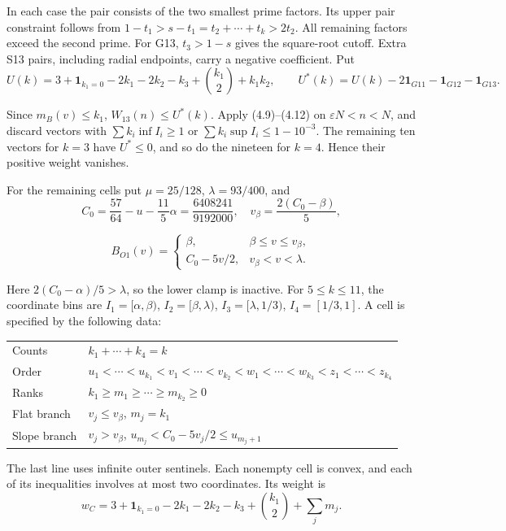 In each case the pair consists of the two smallest prime factors.
Its upper pair constraint follows from
$1-t_1>s-t_1=t_2+\cdots+t_k>2t_2$.
All remaining factors exceed the second prime.
For G13, $t_3>1-s$ gives the square-root cutoff.
Extra S13 pairs, including radial endpoints, carry a negative coefficient.
Put
\begingroup\small
\[
 U(k)=3+\mathbf1_{k_1=0}-2k_1-2k_2-k_3
          +\binom{k_1}{2}+k_1k_2,\qquad
 U^*(k)=U(k)-2\mathbf1_{G11}-\mathbf1_{G12}-\mathbf1_{G13}.
\tag{5.29b}
\]

\endgroup
Since $m_B(v)\le k_1$, $W_{13}(n)\le U^*(k)$.
Apply (4.9)--(4.12) on $\varepsilon N<n<N$,
and discard vectors with $\sum k_i\inf I_i\ge1$
or $\sum k_i\sup I_i\le1-10^{-3}$.
The remaining ten vectors for $k=3$ have $U^*\le0$,
and so do the nineteen for $k=4$.
Hence their positive weight vanishes.

For the remaining cells put $\mu=25/128$, $\lambda=93/400$, and
\[
 C_0=\frac{57}{64}-u-\frac{11}{5}\alpha=\frac{6408241}{9192000},
 \quad v_\beta=\frac{2(C_0-\beta)}5,
\]

\[
 B_{O1}(v)=\begin{cases}\beta,&\beta\le v\le v_\beta,\\
 C_0-5v/2,&v_\beta<v<\lambda.
 \end{cases}
\tag{5.30}
\]

Here $2(C_0-\alpha)/5>\lambda$, so the lower clamp is inactive.
For $5\le k\le11$, the coordinate bins are
$I_1=[\alpha,\beta)$, $I_2=[\beta,\lambda)$,
$I_3=[\lambda,1/3)$, $I_4=[1/3,1]$.
A cell is specified by the following data:
\begin{center}
\begin{tabular}{@{}lp{}@{}}
\toprule
Counts & $k_1+\cdots+k_4=k$ \\
Order & $u_1<\cdots<u_{k_1}<v_1<\cdots<v_{k_2}<w_1<\cdots<w_{k_3}<z_1<\cdots<z_{k_4}$ \\
Ranks & $k_1\ge m_1\ge\cdots\ge m_{k_2}\ge0$ \\
Flat branch & $v_j\le v_\beta$, $m_j=k_1$ \\
Slope branch & $v_j>v_\beta$, $u_{m_j}<C_0-5v_j/2\le u_{m_j+1}$ \\
\bottomrule
\end{tabular}
\end{center}
The last line uses infinite outer sentinels.
Each nonempty cell is convex,
and each of its inequalities involves at most two coordinates.
Its weight is
\[
 w_C=3+\mathbf1_{k_1=0}-2k_1-2k_2-k_3+\binom{k_1}{2}+\sum_jm_j.
\tag{5.31}
\]

